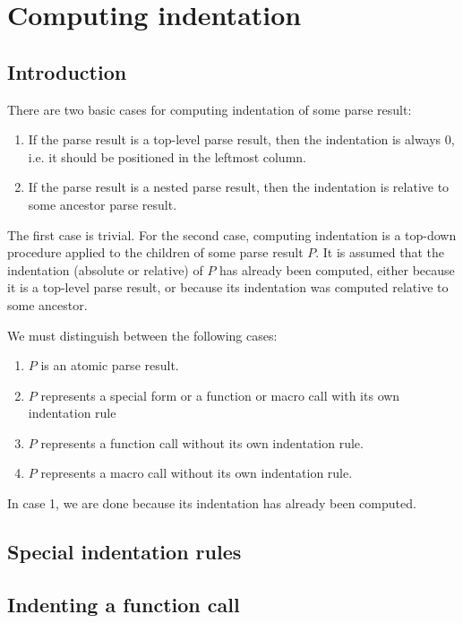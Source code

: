 \section{Computing indentation}
\label{sec-internals-common-lisp-mode-indentation}

\subsection{Introduction}

There are two basic cases for computing indentation of some parse
result:

\begin{enumerate}
\item If the parse result is a top-level parse result, then the
  indentation is always 0, i.e. it should be positioned in the
  leftmost column.
\item If the parse result is a nested parse result, then the
  indentation is relative to some ancestor parse result.
\end{enumerate}

The first case is trivial.  For the second case, computing indentation
is a top-down procedure applied to the children of some parse result
$P$.  It is assumed that the indentation (absolute or relative) of $P$
has already been computed, either because it is a top-level parse
result, or because its indentation was computed relative to some
ancestor.

We must distinguish between the following cases:

\begin{enumerate}
\item $P$ is an atomic parse result.
\item $P$ represents a special form or a function or macro call with
  its own indentation rule
\item $P$ represents a function call without its own indentation rule.
\item $P$ represents a macro call without its own indentation rule.
\end{enumerate}

In case 1,  we are done because its indentation has already been
computed.

\subsection{Special indentation rules}

\subsection{Indenting a function call}

